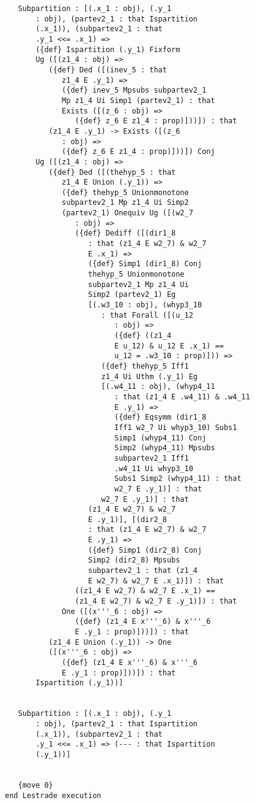 \documentclass[12pt]{article}
\begin{document}
\begin{verbatim}
   Subpartition : [(.x_1 : obj), (.y_1 
       : obj), (partev2_1 : that Ispartition 
       (.x_1)), (subpartev2_1 : that 
       .y_1 <<= .x_1) => 
       ({def} Ispartition (.y_1) Fixform 
       Ug ([(z1_4 : obj) => 
          ({def} Ded ([(inev_5 : that 
             z1_4 E .y_1) => 
             ({def} inev_5 Mpsubs subpartev2_1 
             Mp z1_4 Ui Simp1 (partev2_1) : that 
             Exists ([(z_6 : obj) => 
                ({def} z_6 E z1_4 : prop)]))]) : that 
          (z1_4 E .y_1) -> Exists ([(z_6 
             : obj) => 
             ({def} z_6 E z1_4 : prop)]))]) Conj 
       Ug ([(z1_4 : obj) => 
          ({def} Ded ([(thehyp_5 : that 
             z1_4 E Union (.y_1)) => 
             ({def} thehyp_5 Unionmonotone 
             subpartev2_1 Mp z1_4 Ui Simp2 
             (partev2_1) Onequiv Ug ([(w2_7 
                : obj) => 
                ({def} Dediff ([(dir1_8 
                   : that (z1_4 E w2_7) & w2_7 
                   E .x_1) => 
                   ({def} Simp1 (dir1_8) Conj 
                   thehyp_5 Unionmonotone 
                   subpartev2_1 Mp z1_4 Ui 
                   Simp2 (partev2_1) Eg 
                   [(.w3_10 : obj), (whyp3_10 
                      : that Forall ([(u_12 
                         : obj) => 
                         ({def} ((z1_4 
                         E u_12) & u_12 E .x_1) == 
                         u_12 = .w3_10 : prop)])) => 
                      ({def} thehyp_5 Iff1 
                      z1_4 Ui Uthm (.y_1) Eg 
                      [(.w4_11 : obj), (whyp4_11 
                         : that (z1_4 E .w4_11) & .w4_11 
                         E .y_1) => 
                         ({def} Eqsymm (dir1_8 
                         Iff1 w2_7 Ui whyp3_10) Subs1 
                         Simp1 (whyp4_11) Conj 
                         Simp2 (whyp4_11) Mpsubs 
                         subpartev2_1 Iff1 
                         .w4_11 Ui whyp3_10 
                         Subs1 Simp2 (whyp4_11) : that 
                         w2_7 E .y_1)] : that 
                      w2_7 E .y_1)] : that 
                   (z1_4 E w2_7) & w2_7 
                   E .y_1)], [(dir2_8 
                   : that (z1_4 E w2_7) & w2_7 
                   E .y_1) => 
                   ({def} Simp1 (dir2_8) Conj 
                   Simp2 (dir2_8) Mpsubs 
                   subpartev2_1 : that (z1_4 
                   E w2_7) & w2_7 E .x_1)]) : that 
                ((z1_4 E w2_7) & w2_7 E .x_1) == 
                (z1_4 E w2_7) & w2_7 E .y_1)]) : that 
             One ([(x'''_6 : obj) => 
                ({def} (z1_4 E x'''_6) & x'''_6 
                E .y_1 : prop)]))]) : that 
          (z1_4 E Union (.y_1)) -> One 
          ([(x'''_6 : obj) => 
             ({def} (z1_4 E x'''_6) & x'''_6 
             E .y_1 : prop)]))]) : that 
       Ispartition (.y_1))]


   Subpartition : [(.x_1 : obj), (.y_1 
       : obj), (partev2_1 : that Ispartition 
       (.x_1)), (subpartev2_1 : that 
       .y_1 <<= .x_1) => (--- : that Ispartition 
       (.y_1))]


   {move 0}
end Lestrade execution
\end{verbatim}
\end{document}
